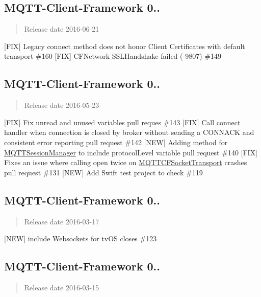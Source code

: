 \subsection*{M\+Q\+T\+T-\/\+Client-\/\+Framework 0..}

\begin{quote}
Release date 2016-\/06-\/21 \end{quote}


\mbox{[}F\+IX\mbox{]} Legacy connect method does not honor Client Certificates with default transport \#160 \mbox{[}F\+IX\mbox{]} C\+F\+Network S\+S\+L\+Handshake failed (-\/9807) \#149

\subsection*{M\+Q\+T\+T-\/\+Client-\/\+Framework 0..}

\begin{quote}
Release date 2016-\/05-\/23 \end{quote}


\mbox{[}F\+IX\mbox{]} Fix unread and unused variables pull reques \#143 \mbox{[}F\+IX\mbox{]} Call connect handler when connection is closed by broker without sending a C\+O\+N\+N\+A\+CK and consistent error reporting pull request \#142 \mbox{[}N\+EW\mbox{]} Adding method for \hyperlink{interface_m_q_t_t_session_manager}{M\+Q\+T\+T\+Session\+Manager} to include protocol\+Level variable pull request \#140 \mbox{[}F\+IX\mbox{]} Fixes an issue where calling open twice on \hyperlink{interface_m_q_t_t_c_f_socket_transport}{M\+Q\+T\+T\+C\+F\+Socket\+Transport} crashes pull request \#131 \mbox{[}N\+EW\mbox{]} Add Swift test project to check \#119

\subsection*{M\+Q\+T\+T-\/\+Client-\/\+Framework 0..}

\begin{quote}
Release date 2016-\/03-\/17 \end{quote}


\mbox{[}N\+EW\mbox{]} include Websockets for tv\+OS closes \#123

\subsection*{M\+Q\+T\+T-\/\+Client-\/\+Framework 0..}

\begin{quote}
Release date 2016-\/03-\/15 \end{quote}


